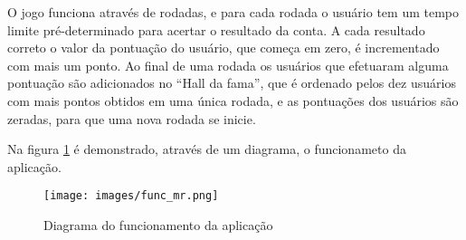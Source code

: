 O jogo funciona através de rodadas, e para cada rodada o usuário tem um tempo limite pré-determinado para acertar o resultado da conta. A cada resultado correto o valor da pontuação do usuário, que começa em zero, é incrementado com mais um ponto. Ao final de uma rodada os usuários que efetuaram alguma pontuação são adicionados no ``Hall da fama'', que é ordenado pelos dez usuários com mais pontos obtidos em uma única rodada, e as pontuações dos usuários são zeradas, para que uma nova rodada se inicie. 

Na figura \ref{fig: Diagrama do funcionamento da aplicação} é demonstrado, através de um diagrama, o funcionameto da aplicação. 

    \begin{figure}[htb]
    \centering
    \texttt{[image: images/func\_mr.png]}
    \caption{Diagrama do funcionamento da aplicação}
    \label{fig: Diagrama do funcionamento da aplicação}
    \end{figure}

